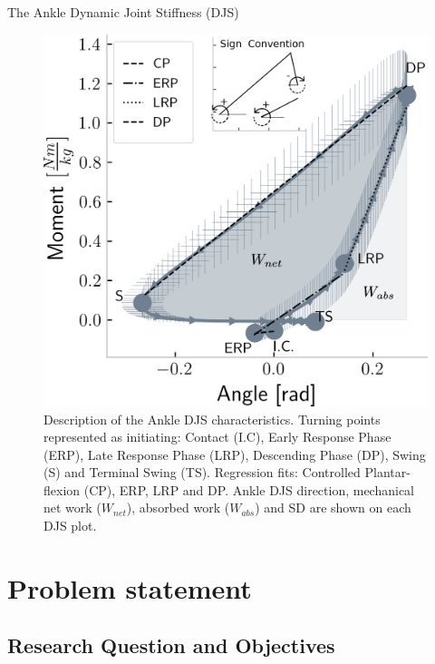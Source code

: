\documentclass[10pt]{beamer}
\begin{document}
\begin{frame}{The Ankle Dynamic Joint Stiffness (DJS)}

\begin{figure}[h]
\begin{center}
\centerline{\includegraphics[scale=0.60]{Feathergraphics/general_conventions_QS.png}}
\caption{{\footnotesize Description of the Ankle DJS characteristics. Turning points represented as initiating: Contact (I.C), Early Response Phase (ERP), Late Response Phase (LRP), Descending Phase (DP), Swing (S) and Terminal Swing (TS). Regression fits: Controlled Plantar-flexion (CP), ERP, LRP and DP. Ankle DJS direction, mechanical net work ($W_{net}$), absorbed work ($W_{abs}$) and SD are shown on each DJS plot.}}
\label{fig:conventions}
\end{center}
\end{figure}

\end{frame}

\section{Problem statement}

\subsection{Research Question and Objectives}
\end{document}
